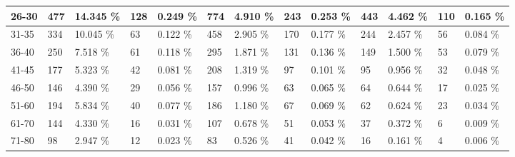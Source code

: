 \begin{table*}[]
\begin{tabular}{|l|l|l|l|l|l|l|l|l|l|l|l|l|}
        26-30   & 477                                         & 14.345 \%                                      & 128                                     & 0.249 \%                     & 774                        & 4.910 \%                     & 243   & 0.253 \%& 443  & 4.462 \% & 110   & 0.165 \%\\ \hline
        31-35   & 334                                         & 10.045 \%                                      & 63                                      & 0.122 \%                     & 458                        & 2.905 \%                     & 170   & 0.177 \%& 244  & 2.457 \% & 56    & 0.084 \%\\ \hline
        36-40   & 250                                         & 7.518 \%                                       & 61                                      & 0.118 \%                     & 295                        & 1.871 \%                     & 131   & 0.136 \%& 149  & 1.500 \% & 53    & 0.079 \%\\ \hline
        41-45   & 177                                         & 5.323 \%                                       & 42                                      & 0.081 \%                     & 208                        & 1.319 \%                     & 97    & 0.101 \%& 95   & 0.956 \% & 32    & 0.048 \%\\ \hline
        46-50   & 146                                         & 4.390 \%                                       & 29                                      & 0.056 \%                     & 157                        & 0.996 \%                     & 63    & 0.065 \%& 64   & 0.644 \% & 17    & 0.025 \%\\ \hline
        51-60   & 194                                         & 5.834 \%                                       & 40                                      & 0.077 \%                     & 186                        & 1.180 \%                     & 67    & 0.069 \%& 62   & 0.624 \% & 23    & 0.034 \%\\ \hline
        61-70   & 144                                         & 4.330 \%                                       & 16                                      & 0.031 \%                     & 107                        & 0.678 \%                     & 51    & 0.053 \%& 37   & 0.372 \% & 6     & 0.009 \%\\ \hline
        71-80   & 98                                          & 2.947 \%                                       & 12                                      & 0.023 \%                     & 83                         & 0.526 \%                     & 41    & 0.042 \%& 16   & 0.161 \% & 4     & 0.006 \%\\ \hline

\end{tabular}
\end{table*}

